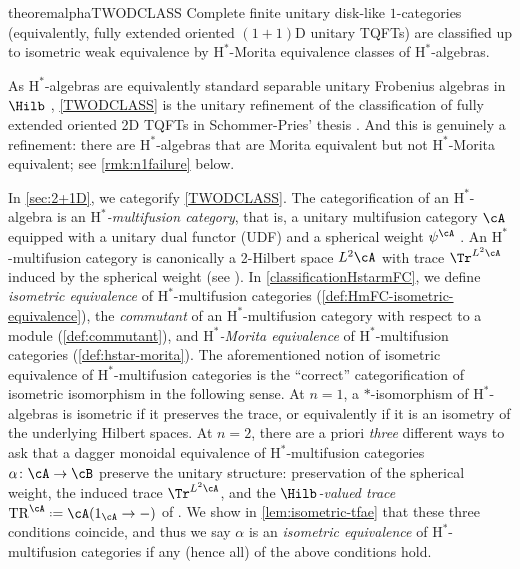 \documentclass[12pt,reqno]{amsart}
\newcounter{alpha}\renewcommand\thealpha{\upshape\Alph{alpha}}
\newcommand{\Hstar}{\ensuremath{\mathrm{H}^{*}}}
\newcommand{\defn}[1]{\emph{#1}}
\DeclareRobustCommand{\coloneq}{\mathrel{\vcenter{\baselineskip0.5ex\lineskiplimit0pt\hbox{\scriptsize{\upshape.}}\hbox{\scriptsize{\upshape.}}}}=}
\begin{document}
\begin{restatable}{theoremalpha}{TWODCLASS}
    \label{TWODCLASS}
    Complete finite unitary disk-like $1$-categories (equivalently, fully extended oriented $(1+1)$D unitary TQFTs) are classified up to isometric weak equivalence by $\Hstar$-Morita equivalence classes of $\Hstar$-algebras.
\end{restatable}

As $\Hstar$-algebras are equivalently standard separable unitary Frobenius algebras in $\Hilb$ \cite[§I.3.6]{UQSL}, \cref{TWODCLASS} is the unitary refinement of the classification of fully extended oriented 2D TQFTs in Schommer-Pries' thesis \cite{SP09}. And this is genuinely a refinement: there are $\Hstar$-algebras that are Morita equivalent but not $\Hstar$-Morita equivalent; see \cref{rmk:n1failure} below.

In \cref{sec:2+1D}, we categorify \cref{TWODCLASS}. The categorification of an $\Hstar$-algebra is an \defn{$\Hstar$-multifusion category}, that is, a unitary multifusion category $\cA$ equipped with a unitary dual functor (UDF) \cite{Pen20} and a spherical weight $\psi^\cA$ \cite[Defn. 3.1]{3Hilb}. An $\Hstar$-multifusion category is canonically a 2-Hilbert space $L^2\cA$ with trace $\Tr^{L^2\cA}$ induced by the spherical weight (see \cite[Rmk. 3.2]{3Hilb}). In \cref{classificationHstarmFC}, we define \defn{isometric equivalence} of $\Hstar$-multifusion categories (\cref{def:HmFC-isometric-equivalence}), the \defn{commutant} of an $\Hstar$-multifusion category with respect to a module (\cref{def:commutant}), and \defn{$\Hstar$-Morita equivalence} of $\Hstar$-multifusion categories (\cref{def:hstar-morita}). The aforementioned notion of isometric equivalence of $\Hstar$-multifusion categories is the ``correct'' categorification of isometric isomorphism in the following sense. At $n=1$, a $*$-isomorphism of $\Hstar$-algebras is isometric if it preserves the trace, or equivalently if it is an isometry of the underlying Hilbert spaces. At $n=2$, there are a priori \emph{three} different ways to ask that a dagger monoidal equivalence of $\Hstar$-multifusion categories $\alpha\colon\cA\to\cB$ preserve the unitary structure: preservation of the spherical weight, the induced trace $\Tr^{L^2\cA}$, and the \defn{$\Hilb$-valued trace} $\mathrm{TR}^\cA\coloneq\cA(1_\cA \to -)$ of \cite[Rmk. 3.30]{bases}. We show in \cref{lem:isometric-tfae} that these three conditions coincide, and thus we say $\alpha$ is an \defn{isometric equivalence} of $\Hstar$-multifusion categories if any (hence all) of the above conditions hold.
\end{document}

